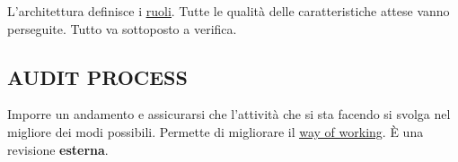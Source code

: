 		L'architettura definisce i {\underline{\hyperref[ruoli]{ruoli}}}.	
		Tutte le qualità delle caratteristiche attese vanno perseguite. %
		Tutto va sottoposto a verifica.
	
		\subsection{AUDIT PROCESS}  \label{audit}
		Imporre un andamento e assicurarsi che l'attività che si sta facendo si svolga nel migliore dei modi possibili. Permette di migliorare il \underline{\hyperref[way]{way of working}}. È una revisione \textbf{esterna}.
		
	
